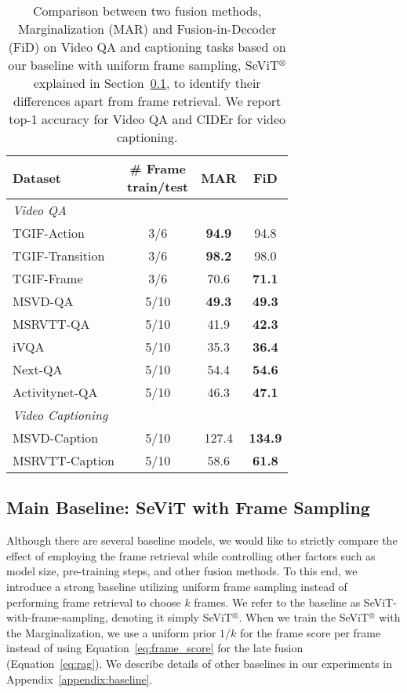 \documentclass{article}
\newcommand{\frameworkname}{SeViT}
\begin{document}
\begin{table}[t!]
    \centering
    \small
    \caption{Comparison between two fusion methods, Marginalization (MAR) and Fusion-in-Decoder (FiD) on Video QA and captioning tasks based on our baseline with uniform frame sampling, \frameworkname{}$^{\otimes}$ explained in Section~\ref{subsec:baseline}, to identify their differences apart from frame retrieval. We report top-1 accuracy for Video QA and CIDEr for video captioning.}
    \vskip 0.15in
\begin{tabular}{lccc}
        \toprule
        Dataset & \makecell{\# Frame \\ train/test} & MAR & FiD \\
        \midrule
        \textit{Video QA} & & & \\
        TGIF-Action & 3/6 & \textbf{94.9} & 94.8 \\
        TGIF-Transition & 3/6 & \textbf{98.2} & 98.0 \\
        TGIF-Frame & 3/6 & 70.6 & \textbf{71.1} \\
        MSVD-QA & 5/10 & \textbf{49.3} & \textbf{49.3} \\
        MSRVTT-QA & 5/10 & 41.9 & \textbf{42.3} \\
        iVQA & 5/10 & 35.3 & \textbf{36.4} \\
        Next-QA & 5/10 & 54.4 & \textbf{54.6} \\
        Activitynet-QA & 5/10 & 46.3 & \textbf{47.1} \\
        \midrule
        \textit{Video Captioning} & & & \\
        MSVD-Caption & 5/10 & 127.4 & \textbf{134.9} \\
        MSRVTT-Caption & 5/10 & 58.6 & \textbf{61.8} \\
        \bottomrule
    \end{tabular}
\label{table:comparing_fusion_method}
    \vspace{-2mm}
\end{table} 
\subsection{Main Baseline: \frameworkname{} with Frame Sampling}
\label{subsec:baseline}

Although there are several baseline models, we would like to strictly compare the effect of employing the frame retrieval while controlling other factors such as model size, pre-training steps, and other fusion methods. To this end, we introduce a strong baseline utilizing uniform frame sampling instead of performing frame retrieval to choose $k$ frames. We refer to the baseline as \frameworkname{}-with-frame-sampling, denoting it simply \frameworkname{}$^{\otimes}$. When we train the \frameworkname{}$^{\otimes}$ with the Marginalization, we use a uniform prior $1/k$ for the frame score per frame instead of using Equation~\ref{eq:frame_score} for the late fusion (Equation~\ref{eq:rag}). We describe details of other baselines in our experiments in Appendix~\ref{appendix:baseline}.
\end{document}

